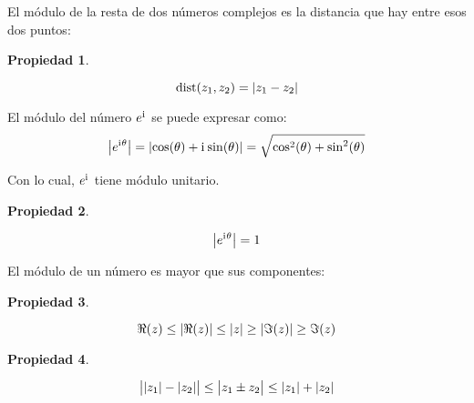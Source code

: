 \documentclass[a5paper,12pt,twoside]{book}
\newtheorem{prop}{{Propiedad}}[chapter]
\begin{document}
El módulo de la resta de dos números complejos es la distancia que hay entre esos dos puntos:

\begin{mdframed}[style=MyFrame1]
    \begin{prop}
        \label{prop:distance}
    \end{prop}
    \begin{equation*}
        \operatorname{dist}(z_1,z_2)={\left| {z_1-z_2} \right|}
    \end{equation*}
\end{mdframed}

El módulo del número $e^\mathrm{i}\mkern1mu$ se puede expresar como:
\begin{equation*}
    {\left| {e^{\mathrm{i}\mkern1mu\theta}} \right|} = {\left| {\cos(\theta) + \mathrm{i}\mkern1mu \sin(\theta)} \right|} = \sqrt{\cos^2(\theta) + \sin^2(\theta)}
\end{equation*}

Con lo cual, $e^\mathrm{i}\mkern1mu$ tiene módulo unitario.

\begin{mdframed}[style=MyFrame1]
    \begin{prop}
        \label{prop:eAbsoluteValue}
    \end{prop}
    \begin{equation*}
        {\left| {e^{\mathrm{i}\mkern1mu\theta}} \right|} = 1
    \end{equation*}
\end{mdframed}

El módulo de un número es mayor que sus componentes:

\begin{mdframed}[style=MyFrame1]
    \begin{prop}
        \label{prop:zAbsoluteValue}
    \end{prop}
    \begin{equation*}
        \Re(z) \leq {\left| {\Re(z)} \right|} \leq {\left| {z} \right|} \geq {\left| {\Im(z)} \right|} \geq \Im(z)
    \end{equation*}
\end{mdframed}

\begin{mdframed}[style=MyFrame1]
    \begin{prop}
        \label{prop:triangleInequality}
    \end{prop}
    \begin{equation*}
        \big| {\left| {z_1} \right|}-{\left| {z_2} \right|} \big| \leq \big| z_1 \pm z_2 \big|\leq {\left| {z_1} \right|} + {\left| {z_2} \right|}
    \end{equation*}
\end{mdframed}
\end{document}

